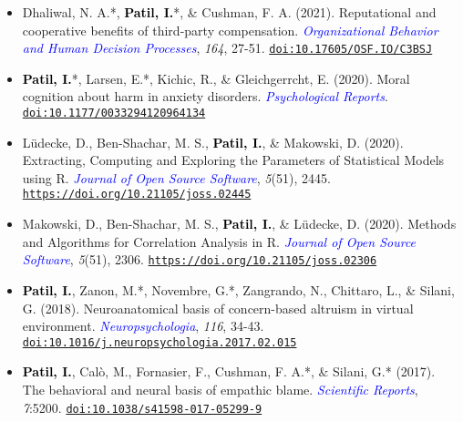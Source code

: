 \documentclass[10pt]{article}
\begin{document}
\begin{itemize}
	\item Dhaliwal, N. A.*, \textbf{\textcolor{black}{Patil, I.}}*, \& Cushman, F. A. (2021). Reputational and cooperative benefits of third-party compensation. \textit{\textcolor{blue}{Organizational Behavior and Human Decision Processes}}, \textit{164}, 27-51. \href{https://www.researchgate.net/publication/349073655_Reputational_and_cooperative_benefits_of_third-party_compensation}{\tt doi:10.17605/OSF.IO/C3BSJ}
	
	\item  \textbf{\textcolor{black}{Patil, I.}}*, Larsen, E.*, Kichic, R., \& Gleichgerrcht, E. (2020). Moral cognition about harm in anxiety  disorders. \textit{\textcolor{blue}{Psychological Reports}}. \href{https://psyarxiv.com/g5p7v/}{\tt doi:10.1177/0033294120964134}
	
    \item Lüdecke, D., Ben-Shachar,  M. S., \textbf{\textcolor{black}{Patil, I.}}, \& Makowski, D. (2020). Extracting, Computing and Exploring the Parameters of Statistical Models using R. \textit{\textcolor{blue}{Journal of Open Source Software}}, \textit{5}(51), 2445. \href{https://joss.theoj.org/papers/10.21105/joss.02445}{\tt https://doi.org/10.21105/joss.02445}
	
    \item Makowski, D., Ben-Shachar,  M. S., \textbf{\textcolor{black}{Patil, I.}}, \& Lüdecke, D. (2020). Methods and Algorithms for Correlation Analysis in R. \textit{\textcolor{blue}{Journal of Open Source Software}}, \textit{5}(51), 2306. \href{https://joss.theoj.org/papers/10.21105/joss.02306}{\tt https://doi.org/10.21105/joss.02306}
	
	\item \textbf{\textcolor{black}{Patil, I.}}, Zanon, M.*, Novembre, G.*, Zangrando, N., Chittaro, L., \& Silani, G. (2018). Neuroanatomical basis of concern-based altruism in virtual environment. \textit{\textcolor{blue}{Neuropsychologia}}, \textit{116}, 34-43. \href{https://drive.google.com/open?id=0B6_u70YpdJKnWU0zblpBOUMxRXc}{\tt doi:10.1016/j.neuropsychologia.2017.02.015}
		
	\item \textbf{\textcolor{black}{Patil, I.}}, Cal\`{o}, M., Fornasier, F., Cushman, F. A.*, \& Silani, G.* (2017). The behavioral and neural basis of empathic blame. 
 \textit{\textcolor{blue}{Scientific Reports}}, \textit{7}:5200. \href{https://drive.google.com/open?id=0B6_u70YpdJKnT1J6dkk5R1NPZDg}{\tt doi:10.1038/s41598-017-05299-9}
	

\end{itemize}
\end{document}
